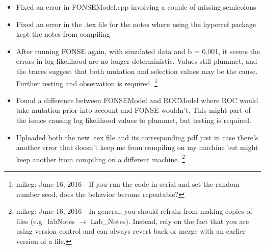 \documentclass[11pt]{labbook}
\begin{document}

\begin{itemize}
    \item Fixed an error in FONSEModel.cpp involving a couple of missing semicolons
    \item Fixed an error in the .tex file for the notes where using the hyperref package kept the notes from compiling
    \item After running FONSE again, with simulated data and b = 0.001, it seems the errors in log likelihood are no longer deterministic. Values still plummet, and the traces suggest that both mutation and selection values may be the cause. Further testing and observation is required.
      \footnote{mikeg: June 16, 2016 - If you run the code in serial and set the random number seed, does the behavior become repeatable?}
    \item Found a difference between FONSEModel and ROCModel where ROC would take mutation prior into account and FONSE wouldn't. This might part of the issues causing log likelihood values to plummet, but testing is required.
    \item Uploaded both the new .tex file and its corresponding pdf just in case there's another error that doesn't keep me from compiling on my machine but might keep another from compiling on a different machine.
      \footnote{mikeg: June 16, 2016 - In general, you should refrain from making copies of files (e.g.~labNotes  $\rightarrow$ Lab\_Notes). 
        Instead, rely on the fact that you are using version control and can always revert back or merge with an earlier version of a file.
     }
\end{itemize}

\end{document}
